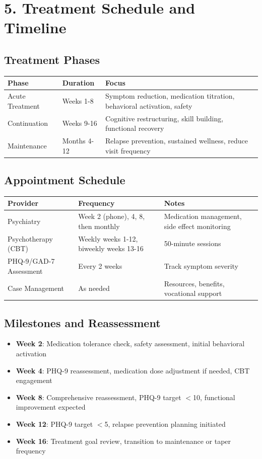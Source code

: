 \documentclass[11pt,letterpaper]{article}
\begin{document}
\section*{5. Treatment Schedule and Timeline}

\subsection*{Treatment Phases}

\begin{tabularx}{\textwidth}{|l|l|X|}
\hline
\textbf{Phase} & \textbf{Duration} & \textbf{Focus} \\ \hline
Acute Treatment & Weeks 1-8 & Symptom reduction, medication titration, behavioral activation, safety \\ \hline
Continuation & Weeks 9-16 & Cognitive restructuring, skill building, functional recovery \\ \hline
Maintenance & Months 4-12 & Relapse prevention, sustained wellness, reduce visit frequency \\ \hline
\end{tabularx}

\subsection*{Appointment Schedule}

\begin{tabularx}{\textwidth}{|l|l|X|}
\hline
\textbf{Provider} & \textbf{Frequency} & \textbf{Notes} \\ \hline
Psychiatry & Week 2 (phone), 4, 8, then monthly & Medication management, side effect monitoring \\ \hline
Psychotherapy (CBT) & Weekly weeks 1-12, biweekly weeks 13-16 & 50-minute sessions \\ \hline
PHQ-9/GAD-7 Assessment & Every 2 weeks & Track symptom severity \\ \hline
Case Management & As needed & Resources, benefits, vocational support \\ \hline
\end{tabularx}

\subsection*{Milestones and Reassessment}

\begin{itemize}[leftmargin=*]
    \item \textbf{Week 2}: Medication tolerance check, safety assessment, initial behavioral activation
    \item \textbf{Week 4}: PHQ-9 reassessment, medication dose adjustment if needed, CBT engagement
    \item \textbf{Week 8}: Comprehensive reassessment, PHQ-9 target $<$10, functional improvement expected
    \item \textbf{Week 12}: PHQ-9 target $<$5, relapse prevention planning initiated
    \item \textbf{Week 16}: Treatment goal review, transition to maintenance or taper frequency
\end{itemize}
\end{document}
